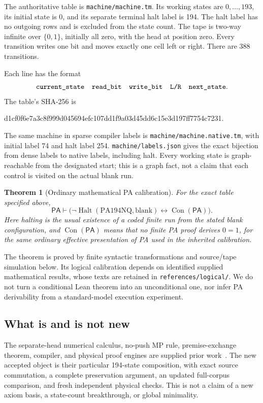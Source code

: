 \documentclass[10pt,letterpaper]{article}
\newtheorem{theorem}{Theorem}[section]
\newcommand{\PA}{\mathsf{PA}}
\newcommand{\Con}{\operatorname{Con}}
\newcommand{\Halt}{\operatorname{Halt}}
\newcommand{\file}[1]{\nolinkurl{#1}}
\begin{document}
The authoritative table is \file{machine/machine.tm}. Its working states are
\(0,\ldots,193\), its initial state is 0, and its separate terminal halt label
is 194. The halt label has no outgoing rows and is excluded from the state
count. The tape is two-way infinite over \(\{0,1\}\), initially all zero,
with the head at position zero. Every transition writes one bit and moves
exactly one cell left or right. There are 388 transitions.

Each line has the format
\[
        \texttt{current\_state\quad read\_bit\quad write\_bit\quad L/R\quad next\_state}.
\]
The table's SHA-256 is
\begin{center}\small\ttfamily
d1cf0f6e7a3c8f999d045694efc107dd1f9a03d45dd6c15e3d197ff7754c7231.
\end{center}
The same machine in sparse compiler labels is
\file{machine/machine.native.tm}, with initial label 74 and halt label 254.
\file{machine/labels.json} gives the exact bijection from dense labels to
native labels, including halt. Every working state is graph-reachable from
the designated start; this is a graph fact, not a claim that each control is
visited on the actual blank run.

\begin{theorem}[Ordinary mathematical PA calibration]\label{thm:main}
For the exact table specified above,
\[
 \PA\vdash
 \bigl(\neg\Halt(\mathrm{PA194NQ},\mathrm{blank})
                   \leftrightarrow\Con(\PA)\bigr).
\]
Here halting is the usual existence of a coded finite run from the stated
blank configuration, and \(\Con(\PA)\) means that no finite PA proof derives
\(0=1\), for the same ordinary effective presentation of PA used in the
inherited calibration.
\end{theorem}

The theorem is proved by finite syntactic transformations and source/tape
simulation below. Its logical calibration depends on identified supplied
mathematical results, whose texts are retained in \file{references/logical/}.
We do not turn a conditional Lean theorem into an unconditional one, nor
infer PA derivability from a standard-model execution experiment.

\subsection{What is and is not new}

The separate-head numerical calculus, no-push MP rule, premise-exchange
theorem, compiler, and physical proof engines are supplied prior
work~\cite{primary,nopush,exchange,upstream}. The
new accepted object is their particular 194-state composition, with exact
source commutation, a complete preservation argument, an updated full-corpus
comparison, and fresh independent physical checks. This is not a claim of a
new axiom basis, a state-count breakthrough, or global minimality.
\end{document}
